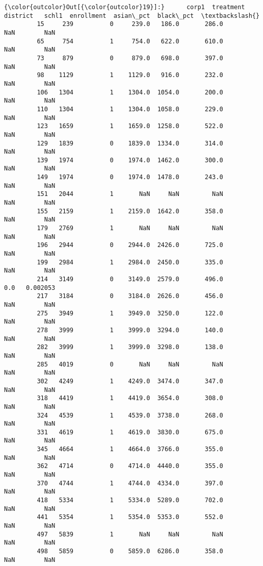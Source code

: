 \documentclass[11pt]{article}
\begin{document}
\begin{Verbatim}[commandchars=\\\{\}]
{\color{outcolor}Out[{\color{outcolor}19}]:}      corp1  treatment  district   schl1  enrollment  asian\_pct  black\_pct  \textbackslash{}
         15     239          0     239.0   186.0       286.0        NaN        NaN   
         65     754          1     754.0   622.0       610.0        NaN        NaN   
         73     879          0     879.0   698.0       397.0        NaN        NaN   
         98    1129          1    1129.0   916.0       232.0        NaN        NaN   
         106   1304          1    1304.0  1054.0       200.0        NaN        NaN   
         110   1304          1    1304.0  1058.0       229.0        NaN        NaN   
         123   1659          1    1659.0  1258.0       522.0        NaN        NaN   
         129   1839          0    1839.0  1334.0       314.0        NaN        NaN   
         139   1974          0    1974.0  1462.0       300.0        NaN        NaN   
         149   1974          0    1974.0  1478.0       243.0        NaN        NaN   
         151   2044          1       NaN     NaN         NaN        NaN        NaN   
         155   2159          1    2159.0  1642.0       358.0        NaN        NaN   
         179   2769          1       NaN     NaN         NaN        NaN        NaN   
         196   2944          0    2944.0  2426.0       725.0        NaN        NaN   
         199   2984          1    2984.0  2450.0       335.0        NaN        NaN   
         214   3149          0    3149.0  2579.0       496.0        0.0   0.002053   
         217   3184          0    3184.0  2626.0       456.0        NaN        NaN   
         275   3949          1    3949.0  3250.0       122.0        NaN        NaN   
         278   3999          1    3999.0  3294.0       140.0        NaN        NaN   
         282   3999          1    3999.0  3298.0       138.0        NaN        NaN   
         285   4019          0       NaN     NaN         NaN        NaN        NaN   
         302   4249          1    4249.0  3474.0       347.0        NaN        NaN   
         318   4419          1    4419.0  3654.0       308.0        NaN        NaN   
         324   4539          1    4539.0  3738.0       268.0        NaN        NaN   
         331   4619          1    4619.0  3830.0       675.0        NaN        NaN   
         345   4664          1    4664.0  3766.0       355.0        NaN        NaN   
         362   4714          0    4714.0  4440.0       355.0        NaN        NaN   
         370   4744          1    4744.0  4334.0       397.0        NaN        NaN   
         418   5334          1    5334.0  5289.0       702.0        NaN        NaN   
         441   5354          1    5354.0  5353.0       552.0        NaN        NaN   
         497   5839          1       NaN     NaN         NaN        NaN        NaN   
         498   5859          0    5859.0  6286.0       358.0        NaN        NaN   
         

\end{Verbatim}
\end{document}
